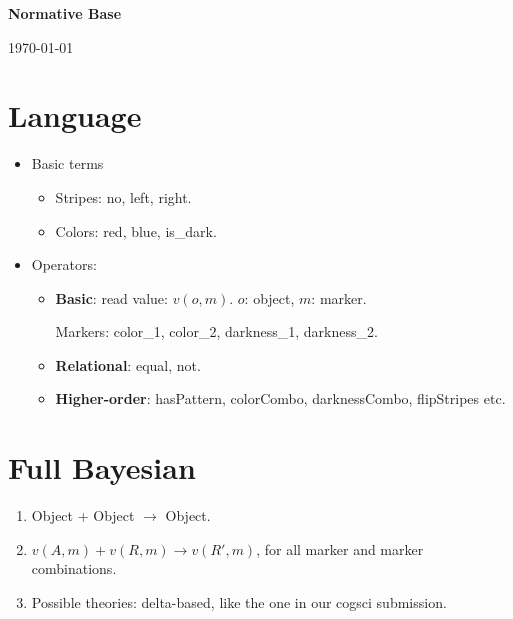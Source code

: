 \documentclass[11pt]{article}
\begin{document}

\begin{center}
{\bf Normative Base }

{\normalsize \today}
\end{center}




\section*{Language}

\begin{itemize}

\item Basic terms
	
	\begin{itemize}
	\item Stripes: no, left, right.
	\item Colors: red, blue, is\_dark.
	\end{itemize}

\item Operators: 
	\begin{itemize}
	\item \textbf{Basic}: read value: $v(o, m)$. $o$: object, $m$: marker.

	Markers: color\_1, color\_2, darkness\_1, darkness\_2.

	\item \textbf{Relational}: equal, not.

	\item \textbf{Higher-order}: hasPattern, colorCombo, darknessCombo, flipStripes etc.
	\end{itemize}

\end{itemize}

\section*{Full Bayesian}

\begin{enumerate}
\item Object + Object $\to$ Object.
\item $v(A, m) + v(R, m) \to v(R', m)$, for all marker and marker combinations.
\item Possible theories: delta-based, like the one in our cogsci submission.
\end{enumerate}
\end{document}
